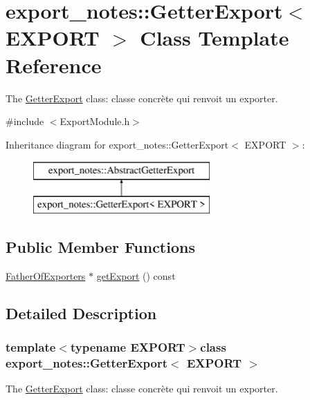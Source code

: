 \hypertarget{classexport__notes_1_1_getter_export}{\section{export\-\_\-notes\-:\-:Getter\-Export$<$ E\-X\-P\-O\-R\-T $>$ Class Template Reference}
\label{classexport__notes_1_1_getter_export}
}


The \hyperlink{classexport__notes_1_1_getter_export}{Getter\-Export} class\-: classe concrète qui renvoit un exporter.  




{\ttfamily \#include $<$Export\-Module.\-h$>$}

Inheritance diagram for export\-\_\-notes\-:\-:Getter\-Export$<$ E\-X\-P\-O\-R\-T $>$\-:\begin{figure}[H]
\begin{center}
\leavevmode
\includegraphics[height=2.000000cm]{classexport__notes_1_1_getter_export}
\end{center}
\end{figure}
\subsection*{Public Member Functions}
\begin{DoxyCompactItemize}
\item 
\hyperlink{classexport__notes_1_1_father_of_exporters}{Father\-Of\-Exporters} $\ast$ \hyperlink{classexport__notes_1_1_getter_export_ad392c3bca7c4bd7bed38988894801b89}{get\-Export} () const 
\end{DoxyCompactItemize}


\subsection{Detailed Description}
\subsubsection*{template$<$typename E\-X\-P\-O\-R\-T$>$class export\-\_\-notes\-::\-Getter\-Export$<$ E\-X\-P\-O\-R\-T $>$}

The \hyperlink{classexport__notes_1_1_getter_export}{Getter\-Export} class\-: classe concrète qui renvoit un exporter. 

